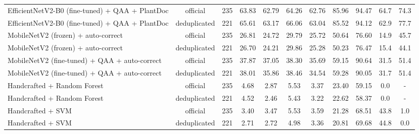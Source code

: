 \begin{table}[t]
\begin{tabular}{lcccccccccc}
EfficientNetV2-B0 (fine-tuned) + QAA + PlantDoc & official & 235 & 63.83 & 62.79 & 64.26 & 62.76 & 85.96 & 94.47 & 64.7 & 74.3 \\
EfficientNetV2-B0 (fine-tuned) + QAA + PlantDoc & deduplicated & 221 & 65.61 & 63.17 & 66.06 & 63.04 & 85.52 & 94.12 & 62.9 & 77.7 \\
MobileNetV2 (frozen) + auto-correct & official & 235 & 26.81 & 24.72 & 29.79 & 25.72 & 50.64 & 76.60 & 14.9 & 45.7 \\
MobileNetV2 (frozen) + auto-correct & deduplicated & 221 & 26.70 & 24.21 & 29.86 & 25.28 & 50.23 & 76.47 & 15.4 & 44.1 \\
MobileNetV2 (fine-tuned) + QAA + auto-correct & official & 235 & 37.87 & 37.05 & 38.30 & 35.69 & 59.15 & 90.64 & 31.5 & 51.4 \\
MobileNetV2 (fine-tuned) + QAA + auto-correct & deduplicated & 221 & 38.01 & 35.86 & 38.46 & 34.54 & 59.28 & 90.05 & 31.7 & 51.4 \\
Handcrafted + Random Forest & official & 235 & 4.68 & 2.87 & 5.53 & 3.37 & 23.40 & 59.15 & 0.0 & - \\
Handcrafted + Random Forest & deduplicated & 221 & 4.52 & 2.46 & 5.43 & 3.22 & 22.62 & 58.37 & 0.0 & - \\
Handcrafted + SVM & official & 235 & 3.40 & 3.47 & 5.53 & 3.59 & 21.28 & 68.51 & 43.8 & 1.0 \\
Handcrafted + SVM & deduplicated & 221 & 2.71 & 2.72 & 4.98 & 3.36 & 20.81 & 69.68 & 44.8 & 0.0 \\
\bottomrule
\end{tabular}
\end{table}
